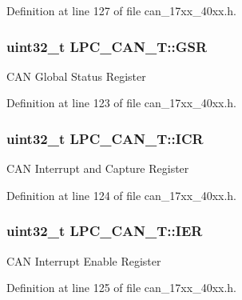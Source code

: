 Definition at line 127 of file can\+\_\+17xx\+\_\+40xx.\+h.

\subsubsection[{\texorpdfstring{G\+SR}{GSR}}]{ uint32\+\_\+t L\+P\+C\+\_\+\+C\+A\+N\+\_\+\+T\+::\+G\+SR}\hypertarget{structLPC__CAN__T_ae36d4c72254feab1bce53a7653612acc}{}\label{structLPC__CAN__T_ae36d4c72254feab1bce53a7653612acc}
C\+AN Global Status Register 

Definition at line 123 of file can\+\_\+17xx\+\_\+40xx.\+h.

\subsubsection[{\texorpdfstring{I\+CR}{ICR}}]{ uint32\+\_\+t L\+P\+C\+\_\+\+C\+A\+N\+\_\+\+T\+::\+I\+CR}\hypertarget{structLPC__CAN__T_a8ccbac222a59bb6da7ba81f8394dbb2e}{}\label{structLPC__CAN__T_a8ccbac222a59bb6da7ba81f8394dbb2e}
C\+AN Interrupt and Capture Register 

Definition at line 124 of file can\+\_\+17xx\+\_\+40xx.\+h.

\subsubsection[{\texorpdfstring{I\+ER}{IER}}]{ uint32\+\_\+t L\+P\+C\+\_\+\+C\+A\+N\+\_\+\+T\+::\+I\+ER}\hypertarget{structLPC__CAN__T_a2ab9628e17449ba6a3bfa9c8479c2e8a}{}\label{structLPC__CAN__T_a2ab9628e17449ba6a3bfa9c8479c2e8a}
C\+AN Interrupt Enable Register 

Definition at line 125 of file can\+\_\+17xx\+\_\+40xx.\+h.

